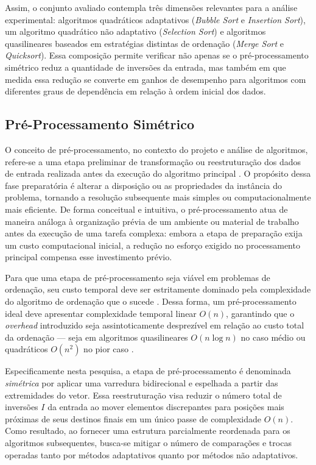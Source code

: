 \documentclass[portuguese]{sbc2025}%
\begin{document}
Assim, o conjunto avaliado contempla três dimensões relevantes para a análise experimental: algoritmos quadráticos adaptativos (\emph{Bubble Sort} e \emph{Insertion Sort}), um algoritmo quadrático não adaptativo (\emph{Selection Sort}) e algoritmos quasilineares baseados em estratégias distintas de ordenação (\emph{Merge Sort} e \emph{Quicksort}). Essa composição permite verificar não apenas se o pré-processamento simétrico reduz a quantidade de inversões da entrada, mas também em que medida essa redução se converte em ganhos de desempenho para algoritmos com diferentes graus de dependência em relação à ordem inicial dos dados.

\subsection{Pré-Processamento Simétrico}

O conceito de pré-processamento, no contexto do projeto e análise de algoritmos, refere-se a uma etapa preliminar de transformação ou reestruturação dos dados de entrada realizada antes da execução do algoritmo principal \citep{cormen_introduction_2022}. O propósito dessa fase preparatória é alterar a disposição ou as propriedades da instância do problema, tornando a resolução subsequente mais simples ou computacionalmente mais eficiente. De forma conceitual e intuitiva, o pré-processamento atua de maneira análoga à organização prévia de um ambiente ou material de trabalho antes da execução de uma tarefa complexa: embora a etapa de preparação exija um custo computacional inicial, a redução no esforço exigido no processamento principal compensa esse investimento prévio.

Para que uma etapa de pré-processamento seja viável em problemas de ordenação, seu custo temporal deve ser estritamente dominado pela complexidade do algoritmo de ordenação que o sucede \citep{cormen_introduction_2022, sedgewick_algorithms_2011}. Dessa forma, um pré-processamento ideal deve apresentar complexidade temporal linear $O(n)$, garantindo que o \emph{overhead} introduzido seja assintoticamente desprezível em relação ao custo total da ordenação — seja em algoritmos quasilineares $O(n \log n)$ no caso médio ou quadráticos $O(n^2)$ no pior caso \citep{knuth_art_1973}.

Especificamente nesta pesquisa, a etapa de pré-processamento é denominada \emph{simétrica} por aplicar uma varredura bidirecional e espelhada a partir das extremidades do vetor. Essa reestruturação visa reduzir o número total de inversões $I$ da entrada ao mover elementos discrepantes para posições mais próximas de seus destinos finais em um único passe de complexidade $O(n)$. Como resultado, ao fornecer uma estrutura parcialmente reordenada para os algoritmos subsequentes, busca-se mitigar o número de comparações e trocas operadas tanto por métodos adaptativos quanto por métodos não adaptativos.
\end{document}
